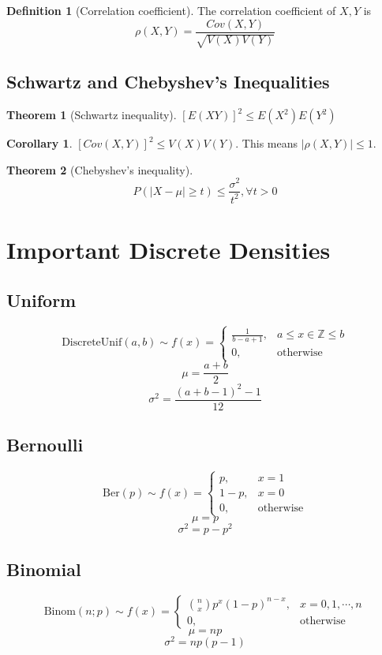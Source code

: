 \documentclass[10pt, a4paper]{extarticle}
\theoremstyle{definition}
\newtheorem{thm}{Theorem}
\newtheorem{cor}{Corollary}[thm]
\newtheorem{defn}{Definition}
\begin{document}
	\begin{defn}[Correlation coefficient]
		The correlation coefficient of $X,Y$ is
		\[\rho(X,Y)=\frac{Cov(X,Y)}{\sqrt{V(X)V(Y)}}\]
	\end{defn}

	\subsection{Schwartz and Chebyshev's Inequalities}
	\begin{thm}[Schwartz inequality]
		$[E(XY)]^2\leq E(X^2)E(Y^2)$
	\end{thm}
	\begin{cor}
		$[Cov(X,Y)]^2\leq V(X)V(Y)$. This means $|\rho(X,Y)|\leq 1$.
	\end{cor}

	\begin{thm}[Chebyshev's inequality]
		\[P(|X-\mu|\geq t)\leq \frac{\sigma^2}{t^2}, \forall t>0\]
	\end{thm}


	\section{Important Discrete Densities}
	\subsection{Uniform}
	\[\text{DiscreteUnif}(a,b)\sim f(x)=\begin{cases}
		\frac{1}{b-a+1},&a\leq x\in\mathbb{Z}\leq b\\
		0,&\text{otherwise}
	\end{cases}\]
	\[\mu = \frac{a+b}{2}\]
	\[\sigma^2=\frac{(a+b-1)^2-1}{12}\]

	\subsection{Bernoulli}
	\[\text{Ber}(p)\sim f(x)=
	\begin{cases}
		p,&x=1\\
		1-p,&x=0\\
		0,&\text{otherwise}
	\end{cases}
	\]
	\[\mu=p\]
	\[\sigma^2=p-p^2\]

	\subsection{Binomial}
	\[\text{Binom}(n;p)\sim f(x)=\begin{cases}
		\binom{n}{x}p^x(1-p)^{n-x},&x=0,1,\cdots,n\\
		0,&\text{otherwise}
	\end{cases}\]
	\[\mu=np\]
	\[\sigma^2=np(p-1)\]
\end{document}
